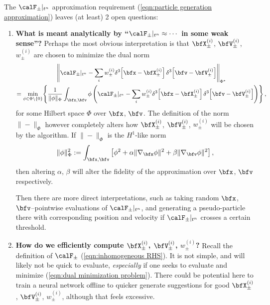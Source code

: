     \begin{remark}
        The $\calF_{\pm}|_{t^{n}}$ approximation requirement (\ref{eqn:particle generation approximation}) leaves (at least) 2 open questions:
        \begin{enumerate}
            \item  {\bf What is meant analytically by ``$\calF_{\pm}|_{t^{n}} \approx \cdots$ in some weak sense''?} Perhaps the most obvious interpretation is that $\bfX_{\pm}^{(i)}$, $\bfV_{\pm}^{(i)}$, $w_{\pm}^{(i)}$ are chosen to minimize the dual norm
            \begin{multline}\label{eqn:dual minimization problem}
                \left\|\calF_{\pm}|_{t^{n}} - \sum_{i}w_{\pm}^{(i)}\delta^{3}\!\left[\bfx - \bfX_{\pm}^{(i)}\right]\delta^{3}\!\left[\bfv - \bfV_{\pm}^{(i)}\right]\right\|_{\Phi^{*}}  \\
                =  \min_{\phi \in \Phi\setminus\{0\}}\!\left\{\frac{1}{\|\phi\|_{\Phi}}\int_{\bfx, \bfv}\phi\left(\calF_{\pm}|_{t^{n}} - \sum_{i}w_{\pm}^{(i)}\delta^{3}\!\left[\bfx - \bfX_{\pm}^{(i)}\right]\delta^{3}\!\left[\bfv - \bfV_{\pm}^{(i)}\right]\right)\right\},
            \end{multline}
            for some Hilbert space $\Phi$ over $\bfx$, $\bfv$. The definition of the norm $\|-\|_{\Phi}$ however completely alters how $\bfX_{\pm}^{(i)}$, $\bfV_{\pm}^{(i)}$, $w_{\pm}^{(i)}$ will be chosen by the algorithm. If $\|-\|_{\Phi}$ is the $H^{1}$-like norm
            \begin{equation}
                \|\phi\|_{\Phi}^{2}  :=  \int_{\bfx, \bfv}\left[\phi^{2} + \alpha\|\nabla_{\bfx}\phi\|^{2} + \beta\|\nabla_{\bfv}\phi\|^{2}\right],
            \end{equation}
            then altering $\alpha$, $\beta$ will alter the fidelity of the approximation over $\bfx$, $\bfv$ respectively.

            Then there are more direct interpretations, such as taking random $\bfx$, $\bfv$--pointwise evaluations of $\calF_{\pm}|_{t^{n}}$, and generating a pseudo-particle there with corresponding position and velocity if $\calF_{\pm}|_{t^{n}}$ crosses a certain threshold.

            \item  {\bf How do we efficiently compute $\bfX_{\pm}^{(i)}$, $\bfV_{\pm}^{(i)}$, $w_{\pm}^{(i)}$?} Recall the definition of $\calF_{\pm}$ (\ref{eqn:inhomogeneous RHS}). It is not simple, and will likely not be quick to evaluate, \emph{especially} if one seeks to evaluate and minimize (\ref{eqn:dual minimization problem}). There could be potential here to train a neural network offline to quicker generate suggestions for good $\bfX_{\pm}^{(i)}$, $\bfV_{\pm}^{(i)}$, $w_{\pm}^{(i)}$, although that feels excessive.
        \end{enumerate}
    \end{remark}

